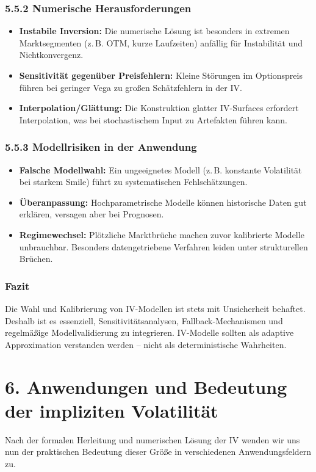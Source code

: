 \documentclass[a4paper,12pt]{article}
\begin{document}
\subsubsection*{5.5.2 Numerische Herausforderungen}

\begin{itemize}
  \item \textbf{Instabile Inversion:} Die numerische Lösung ist besonders in extremen Marktsegmenten (z.\,B. OTM, kurze Laufzeiten) anfällig für Instabilität und Nichtkonvergenz.
  \item \textbf{Sensitivität gegenüber Preisfehlern:} Kleine Störungen im Optionspreis führen bei geringer Vega zu großen Schätzfehlern in der IV.
  \item \textbf{Interpolation/Glättung:} Die Konstruktion glatter IV-Surfaces erfordert Interpolation, was bei stochastischem Input zu Artefakten führen kann.
\end{itemize}

\subsubsection*{5.5.3 Modellrisiken in der Anwendung}

\begin{itemize}
  \item \textbf{Falsche Modellwahl:} Ein ungeeignetes Modell (z.\,B. konstante Volatilität bei starkem Smile) führt zu systematischen Fehlschätzungen.
  \item \textbf{Überanpassung:} Hochparametrische Modelle können historische Daten gut erklären, versagen aber bei Prognosen.
  \item \textbf{Regimewechsel:} Plötzliche Marktbrüche machen zuvor kalibrierte Modelle unbrauchbar. Besonders datengetriebene Verfahren leiden unter strukturellen Brüchen.
\end{itemize}

\subsubsection*{Fazit}

Die Wahl und Kalibrierung von IV-Modellen ist stets mit Unsicherheit behaftet. Deshalb ist es essenziell, Sensitivitätsanalysen, Fallback-Mechanismen und regelmäßige Modellvalidierung zu integrieren. IV-Modelle sollten als adaptive Approximation verstanden werden – nicht als deterministische Wahrheiten.

\section*{6. Anwendungen und Bedeutung der impliziten Volatilität}
Nach der formalen Herleitung und numerischen Lösung der IV wenden wir uns nun der praktischen Bedeutung dieser Größe in verschiedenen Anwendungsfeldern zu.
\end{document}
